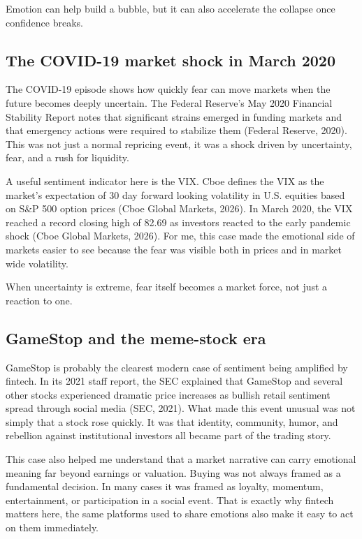 \documentclass[12pt]{article}
\begin{document}
Emotion can help build a bubble, but it can also accelerate the collapse once confidence breaks.

\subsection{The COVID-19 market shock in March 2020}

The COVID-19 episode shows how quickly fear can move markets when the future becomes deeply uncertain. The Federal Reserve's May 2020 Financial Stability Report notes that significant strains emerged in funding markets and that emergency actions were required to stabilize them (Federal Reserve, 2020). This was not just a normal repricing event, it was a shock driven by uncertainty, fear, and a rush for liquidity.

A useful sentiment indicator here is the VIX. Cboe defines the VIX as the market's expectation of 30 day forward looking volatility in U.S. equities based on S\&P 500 option prices (Cboe Global Markets, 2026). In March 2020, the VIX reached a record closing high of 82.69 as investors reacted to the early pandemic shock (Cboe Global Markets, 2026). For me, this case made the emotional side of markets easier to see because the fear was visible both in prices and in market wide volatility.

When uncertainty is extreme, fear itself becomes a market force, not just a reaction to one.

\subsection{GameStop and the meme-stock era}

GameStop is probably the clearest modern case of sentiment being amplified by fintech. In its 2021 staff report, the SEC explained that GameStop and several other stocks experienced dramatic price increases as bullish retail sentiment spread through social media (SEC, 2021). What made this event unusual was not simply that a stock rose quickly. It was that identity, community, humor, and rebellion against institutional investors all became part of the trading story.

This case also helped me understand that a market narrative can carry emotional meaning far beyond earnings or valuation. Buying was not always framed as a fundamental decision. In many cases it was framed as loyalty, momentum, entertainment, or participation in a social event. That is exactly why fintech matters here, the same platforms used to share emotions also make it easy to act on them immediately.
\end{document}
